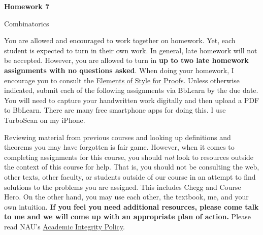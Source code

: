 \documentclass[11pt]{article}%
\theoremstyle{definition}
\newcommand{\blankline}{\pagebreak[2]\vspace{.5\baselineskip}}
\begin{document}
\begin{center}
{\Large\bf Homework 7}

\smallskip

Combinatorics
\end{center}

\thispagestyle{fancy}

You are allowed and encouraged to work together on homework. Yet, each student is expected to turn in their own work. In general, late homework will not be accepted. However, you are allowed to turn in \textbf{up to two late homework assignments with no questions asked}. When doing your homework, I encourage you to consult the \href{http://danaernst.com/teaching/ElementsOfStyle.pdf}{Elements of Style for Proofs}. Unless otherwise indicated, submit each of the following assignments via BbLearn by the due date. You will need to capture your handwritten work digitally and then upload a PDF to BbLearn. There are many free smartphone apps for doing this. I use TurboScan on my iPhone.

\blankline

Reviewing material from previous courses and looking up definitions and theorems you may have forgotten is fair game. However, when it comes to completing assignments for this course, you should \emph{not} look to resources outside the context of this course for help.  That is, you should not be consulting the web, other texts, other faculty, or students outside of our course in an attempt to find solutions to the problems you are assigned.  This includes Chegg and Course Hero. On the other hand, you may use each other, the textbook, me, and your own intuition. \textbf{If you feel you need additional resources, please come talk to me and we will come up with an appropriate plan of action.} Please read NAU's \href{https://www5.nau.edu/policies/Client/Details/828?whoIsLooking=Students&pertainsTo=All&sortDirection=Ascending&page=1}{Academic Integrity Policy}.

\blankline
\end{document}
